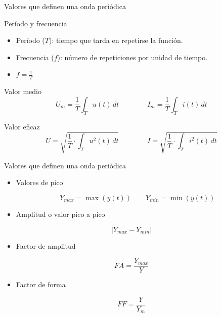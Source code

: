 \documentclass[aspectratio=169, usenames,svgnames,dvipsnames]{beamer}
\begin{document}
\begin{frame}[label={sec:org75a5a99}]{Valores que definen una onda periódica}
\begin{block}{Período y frecuencia}
\begin{itemize}
\item Período (\(T\)): tiempo que tarda en repetirse la función.
\item Frecuencia (\(f\)): número de repeticiones por unidad de tiempo.
\item \(f = \frac{1}{T}\)
\end{itemize}
\end{block}
\begin{block}{Valor medio}
\[
U_m=\frac{1}{T}\int_T u(t)\, dt \qquad \qquad%
I_m=\frac{1}{T}\int_T i(t)\, dt
\]
\end{block}

\begin{block}{Valor eficaz}
\[
U = \sqrt{\frac{1}{T}\cdot\int_{T} u^{2}(t)\, dt} \qquad \qquad%
I = \sqrt{\frac{1}{T}\cdot\int_{T} i^{2}(t)\, dt}
\]
\end{block}
\end{frame}

\begin{frame}[label={sec:org6620496}]{Valores que definen una onda periódica}
\begin{itemize}
\item Valores de pico

\[
Y_{max} = \max(y(t)) \qquad Y_{min} = \min(y(t))
\]

\item Amplitud o valor pico a pico
\end{itemize}

\[
 |Y_{max} - Y_{min}|
\]

\begin{itemize}
\item Factor de amplitud
\end{itemize}

\[FA = \frac{Y_{max}}{Y}\]

\begin{itemize}
\item Factor de forma
\end{itemize}

\[FF = \frac{Y}{Y_{m}}\]
\end{frame}
\end{document}
